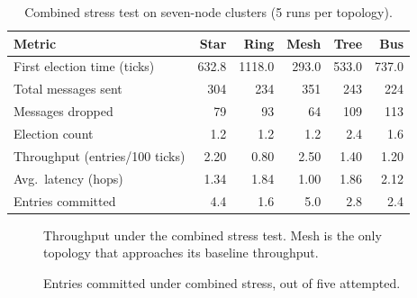 \begin{table}[H]
\centering
\caption{Combined stress test on seven-node clusters (5 runs per topology).}
\label{tab:exp7}
\small
\begin{tabular}{lrrrrr}
\toprule
\textbf{Metric} & \textbf{Star} & \textbf{Ring} & \textbf{Mesh} & \textbf{Tree} & \textbf{Bus} \\
\midrule
First election time (ticks)   & 632.8 & 1118.0 & 293.0 & 533.0 & 737.0 \\
Total messages sent           & 304   & 234    & 351   & 243   & 224 \\
Messages dropped              & 79    & 93     & 64    & 109   & 113 \\
Election count                & 1.2   & 1.2    & 1.2   & 2.4   & 1.6 \\
Throughput (entries/100 ticks)& 2.20  & 0.80   & 2.50  & 1.40  & 1.20 \\
Avg.\ latency (hops)          & 1.34  & 1.84   & 1.00  & 1.86  & 2.12 \\
Entries committed             & 4.4   & 1.6    & 5.0   & 2.8   & 2.4 \\
\bottomrule
\end{tabular}
\end{table}

\begin{figure}[H]
\centering
{}
\caption{Throughput under the combined stress test. Mesh is the only topology that approaches its baseline throughput.}
\label{fig:exp7_throughput}
\end{figure}

\begin{figure}[H]
\centering
{}
\caption{Entries committed under combined stress, out of five attempted.}
\label{fig:exp7_entries}
\end{figure}

